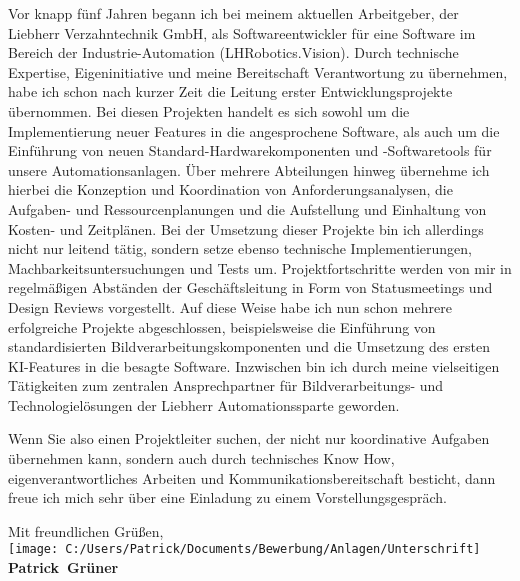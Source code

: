 \documentclass[10pt,a4paper]{article}
\def\firstname{Patrick}
\def\familyname{Grüner}
\begin{document}
Vor knapp fünf Jahren begann ich bei meinem aktuellen Arbeitgeber, der Liebherr Verzahntechnik GmbH, als Softwareentwickler für eine Software im Bereich der Industrie-Automation (LHRobotics.Vision). Durch technische Expertise, Eigeninitiative und meine Bereitschaft Verantwortung zu übernehmen, habe ich schon nach kurzer Zeit die Leitung erster Entwicklungsprojekte übernommen. Bei diesen Projekten handelt es sich sowohl um die Implementierung neuer Features in die angesprochene Software, als auch um die Einführung von neuen Standard-Hardwarekomponenten und -Softwaretools für unsere Automationsanlagen. Über mehrere Abteilungen hinweg übernehme ich hierbei die Konzeption und Koordination von Anforderungsanalysen, die Aufgaben- und Ressourcenplanungen und die Aufstellung und Einhaltung von Kosten- und Zeitplänen. Bei der Umsetzung dieser Projekte bin ich allerdings nicht nur leitend tätig, sondern setze ebenso technische Implementierungen, Machbarkeitsuntersuchungen und Tests um. Projektfortschritte werden von mir in regelmäßigen Abständen der Geschäftsleitung in Form von Statusmeetings und Design Reviews vorgestellt. Auf diese Weise habe ich nun schon mehrere erfolgreiche Projekte abgeschlossen, beispielsweise die Einführung von standardisierten Bildverarbeitungskomponenten und die Umsetzung des ersten KI-Features in die besagte Software. Inzwischen bin ich durch meine vielseitigen Tätigkeiten zum zentralen Ansprechpartner für Bildverarbeitungs- und Technologielösungen der Liebherr Automationssparte geworden.

Wenn Sie also einen Projektleiter suchen, der nicht nur koordinative Aufgaben übernehmen kann, sondern auch durch technisches Know How, eigenverantwortliches Arbeiten und Kommunikationsbereitschaft besticht, dann freue ich mich sehr über eine Einladung zu einem Vorstellungsgespräch.  

Mit freundlichen Grüßen,\\[3em]

\texttt{[image: C:/Users/Patrick/Documents/Bewerbung/Anlagen/Unterschrift]}\\
{\bfseries \firstname~\familyname}\\
%
\vfill%
\end{document}
